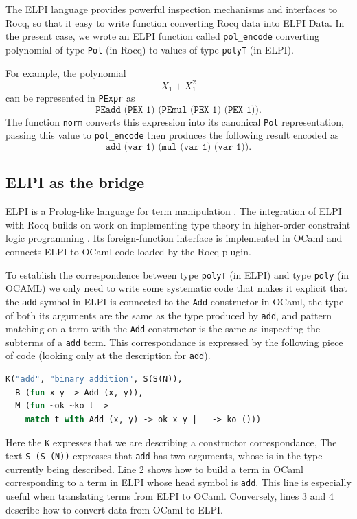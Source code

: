 \documentclass[11pt]{article}
\begin{document}
The ELPI language provides powerful inspection mechanisms and interfaces
to Rocq, so that it easy to write function converting Rocq data into ELPI
Data.  In the present case, we wrote an ELPI function called
{\tt pol\_encode} converting polynomial
of type {\tt Pol} (in Rocq) to values of type {\tt polyT} (in ELPI).

For example, the polynomial
\[
  X_1+X_1^2
\]
can be represented in \texttt{PExpr} as
\[
  \texttt{PEadd (PEX 1) (PEmul (PEX 1) (PEX 1))}.
\]
The function \texttt{norm} converts this expression into its canonical
\texttt{Pol} representation, passing this value to {\tt pol\_encode} then
produces the following result
encoded as
\[
  \texttt{add (var 1) (mul (var 1) (var 1))}.
\]

\subsection{ELPI as the bridge}
ELPI is a Prolog-like language for term manipulation
\cite{DBLP:conf/lpar/DunchevGCT15}. The integration of ELPI with Rocq builds on work on implementing
type theory in higher-order constraint logic programming
\cite{DBLP:journals/mscs/GuidiCT19}. Its foreign-function interface is implemented in OCaml and connects ELPI to OCaml code loaded by the Rocq plugin.

To establish the correspondence between type \texttt{polyT} (in ELPI) and
type \texttt{poly} (in OCAML) we only need to write some systematic code
that makes it explicit that the {\tt add} symbol in ELPI is connected to
the {\tt Add} constructor in OCaml, the type of both its arguments are
the same as the type produced by {\tt add}, and pattern matching on a term
with the {\tt Add} constructor is the same as inspecting the subterms of
a {\tt add} term.  This correspondance is expressed by the following piece of
code (looking only at the description for {\tt add}).
\label{sec:foreign-declaration}
\begin{lstlisting}[language=ML]
K("add", "binary addition", S(S(N)),
  B (fun x y -> Add (x, y)),
  M (fun ~ok ~ko t ->
    match t with Add (x, y) -> ok x y | _ -> ko ()))
\end{lstlisting}
Here the {\tt K} expresses that we are describing a constructor correspondance,
The text {\tt S (S (N))} expresses that {\tt add} has two arguments, whose
is in the type currently being described.  Line 2 shows how to build a term
in OCaml corresponding to a term in ELPI whose head symbol is {\tt add}.  This
line is especially useful when translating terms from ELPI to OCaml.
Conversely, lines 3 and 4 describe how to convert data from OCaml to ELPI.
\end{document}
